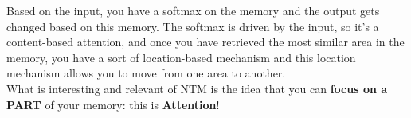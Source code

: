 Based on the input, you have a softmax on the memory and the output gets changed based on this memory. The softmax is driven by the input, so it’s a content-based attention, and once you have retrieved the most similar area in the memory, you have a sort of location-based mechanism 
and this location mechanism allows you to move from one area to another.\\ 

What is interesting and relevant of NTM is the idea that you can \textbf{focus on a PART} of your memory: this is \textbf{Attention}!\\


